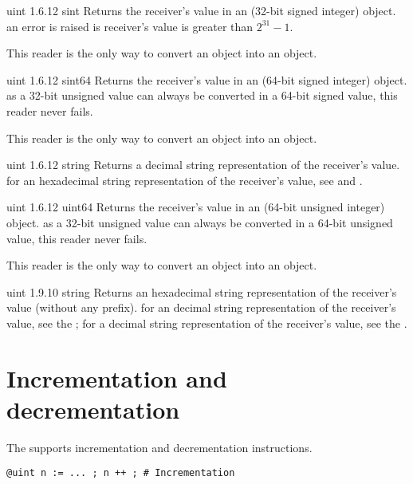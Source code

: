 {uint}
{1.6.12}
{sint}
{Returns the receiver's value in an  (32-bit signed integer) object.}
{an error is raised is receiver's value is greater than $2^{31}-1$.}

This reader is the only way to convert an  object into an  object.




{uint}
{1.6.12}
{sint64}
{Returns the receiver's value in an  (64-bit signed integer) object.}
{as a 32-bit unsigned value can always be converted in a 64-bit signed value, this reader never fails.}

This reader is the only way to convert an  object into an  object.


{uint}
{1.6.12}
{string}
{Returns a decimal string representation of the receiver's value.}
{for an hexadecimal string representation of the receiver's value, see  and .}




{uint}
{1.6.12}
{uint64}
{Returns the receiver's value in an  (64-bit unsigned integer) object.}
{as a 32-bit unsigned value can always be converted in a 64-bit unsigned value, this reader never fails.}

This reader is the only way to convert an  object into an  object.




{uint}
{1.9.10}
{string}
{Returns an hexadecimal string representation of the receiver's value (without any prefix).}
{for an decimal string representation of the receiver's value, see the ; for a decimal string representation of the receiver's value, see the .}






\section{Incrementation and decrementation}

The  supports incrementation and decrementation instructions.

\texttt{@uint n := ... ; n ++ ; \# Incrementation}

